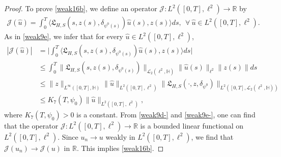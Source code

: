 \documentclass[11pt]{article}
\renewcommand{\leq}{\leqslant}
\numberwithin{equation}{section}
\begin{document}
\begin{proof}
To  prove \eqref{weak16b}, we define an operator
$\mathcal{J}:L^2([0,T],\ell^2 )\rightarrow \mathbb{R}$ by
\begin{align}\label{weak9d-}
\mathcal{J}(\widehat{u})=\int_{0}^T\big\langle
  \mathfrak{L}_{H,S}(s,z(s),
\delta_{\psi^0(s)})\widehat{u}(s),z(s)\big\rangle ds,\ \
\forall\ \widehat{u}\in L^2([0,T],\ell^2 ).
\end{align}
As in \eqref{weak9e}, we infer that  for every
$\widehat{u}\in L^2([0,T],\ell^2 )$,
\begin{align}\label{weak9e-}
|\mathcal{J}(\widehat{u})|&=\Big|
\int_{0}^T\big\langle
  \mathfrak{L}_{H,S}(s,z(s),
\delta_{\psi^0(s)})\widehat{u}(s),z(s)\big\rangle ds\Big|
\nonumber\\&\leq \int_{0}^T
  \|\mathfrak{L}_{H,S}(s,z(s),
\delta_{\psi^0(s)})\|_{\mathcal{L}_2(\ell^2
 ,\mathbb{H})} \|\widehat{u}(s)\|_{\ell^2}\|z(s)\|ds
\nonumber\\&\leq \|z\|_{L^\infty([0,T],\mathbb{H})} \|\widehat{u}\|_{L^2([0,T],\ell^2 )}
\|\mathfrak{L}_{H,S}(\cdot,z,
\delta_{\psi^0})\|_{L^2([0,T],\mathcal{L}_2(\ell^2,
\mathbb{H}))}
\nonumber\\& \leq K_7(T,\psi_0)\|\widehat{u}\|_{L^2([0,T],\ell^2 )},
\end{align}
where $K_7(T,\psi_0)>0$ is a constant.
 From \eqref{weak9d-} and \eqref{weak9e-}, one can find that the operator $\mathcal{J}:L^2([0,T],\ell^2 )\rightarrow \mathbb{R} $ is a  bounded linear
functional on $L^2([0,T],\ell^2 )$. Since $u_n\rightarrow u$ weakly in $L^2([0,T],
\ell^2)$, we find that $\mathcal{J}(u_n)\rightarrow
\mathcal{J}(u)$ in $\mathbb{R}$. This implies
\eqref{weak16b}.




\end{proof}
\end{document}
